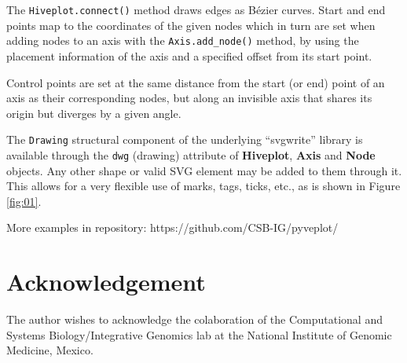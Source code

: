 \documentclass{bioinfo}
\begin{document}
The \verb"Hiveplot.connect()" method draws edges as B\'ezier curves.
Start and end points map to the coordinates of the given nodes which
in turn are set when adding nodes to an axis with the
\verb"Axis.add_node()" method, by using the placement information of
the axis and a specified offset from its start point.

Control points are set at the same distance from the start (or end)
point of an axis as their corresponding nodes, but along an invisible
axis that shares its origin but diverges by a given angle.

The \verb"Drawing" structural component of the underlying ``svgwrite''
library is available through the \verb"dwg" (drawing) attribute of
{\bfseries Hiveplot}, {\bfseries Axis} and {\bfseries Node} objects.
Any other shape or valid SVG element may be added to them through it.
This allows for a very flexible use of marks, tags, ticks, etc., as is
shown in Figure \ref{fig:01}.

More examples in repository: https://github.com/CSB-IG/pyveplot/


\section*{Acknowledgement}
The author wishes to acknowledge the colaboration of the Computational
and Systems Biology/Integrative Genomics lab at the National Institute
of Genomic Medicine, Mexico.



\end{document}
